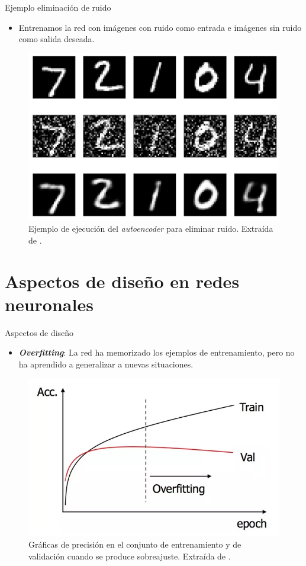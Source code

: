 \documentclass[spanish]{beamer}
\begin{document}
\begin{frame}{Ejemplo eliminación de ruido}
  \begin{itemize}
      \item Entrenamos la red con imágenes con ruido como entrada e imágenes sin ruido como salida deseada.
  \end{itemize}
  \vspace{1em}

\begin{figure}[h]
  \centering
  \includegraphics[width=.6\textwidth]{img/autoencoder_ex2}
  \caption{Ejemplo de ejecución del \textit{autoencoder} para eliminar ruido. Extraída de \parencite{arden_autoencoder_2017}.}
  \label{fig:autoencoder_ex2}
\end{figure}
\end{frame}

\section{Aspectos de diseño en redes neuronales}

\begin{frame}{Aspectos de diseño}
  \begin{itemize}
\item \textbf{\textit{Overfitting}}: La red ha memorizado los ejemplos de entrenamiento, pero no ha aprendido a generalizar a nuevas situaciones.
  \end{itemize}
  \vspace{1em}
\begin{figure}[h]
  \centering
  \includegraphics[width=.6\textwidth]{img/overfitting}
  \caption{Gráficas de precisión en el conjunto de entrenamiento y de validación cuando se produce sobreajuste. Extraída de \parencite{quora_overfitting_2016}.}
  \label{fig:overfitting}
\end{figure}
\end{frame}
\end{document}
